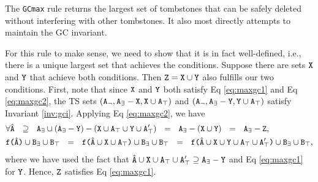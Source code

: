 \documentclass[10pt]{proc}
\numberwithin{equation}{section}
\renewcommand{\tt}[1]{\ifmmode\text{\texttt{#1}}\else\texttt{#1}\fi}
\begin{document}
The \tt{GCmax} rule returns the largest set of tombstones that can be safely deleted without interfering with other tombstones.
It also most directly attempts to maintain the GC invariant.

For this rule to make sense, we need to show that it is in fact well-defined, i.e., there is a unique largest set that achieves the conditions.
Suppose there are sets $\tt{X}$ and $\tt{Y}$ that achieve both conditions.
Then $\tt{Z} = \tt{X} \cup \tt{Y}$ also fulfills our two conditions.
First, note that since $\tt{X}$ and $\tt{Y}$ both satisfy Eq \eqref{eq:maxgc1} and Eq \eqref{eq:maxgc2}, the TS sets $(\tt{A}_\neg, \tt{A}_\exists - \tt{X}, \tt{X} \cup \tt{A}_\top)$ and $(\tt{A}_\neg, \tt{A}_\exists - \tt{Y}, \tt{Y} \cup \tt{A}_\top)$ satisfy Invariant \ref{inv:gci}.
Applying Eq \eqref{eq:maxgc2}, we have
\begin{align*}
&\forall\hat{\tt{A}}
  ~~\supseteq~~ \tt{A}_\exists \cup (\tt{A}_\exists - \tt{Y}) - (\tt{X} \cup \tt{A}_\top \cup \tt{Y} \cup \tt{A}_\top')
  ~~=~~ \tt{A}_\exists - (\tt{X} \cup \tt{Y})
  ~~=~~ \tt{A}_\exists - \tt{Z},\\
&\tt{f($\hat{\tt{A}}$)} \cup \tt{B}_\exists \cup \tt{B}_\top
  ~~=~~ \tt{f($\hat{\tt{A}} \cup \tt{X} \cup \tt{A}_\top$)} \cup \tt{B}_\exists \cup \tt{B}_\top
  ~~=~~ \tt{f($\hat{\tt{A}} \cup \tt{X} \cup \tt{Y} \cup \tt{A}_\top \cup \tt{A}_\top'$)} \cup \tt{B}_\exists \cup \tt{B}_\top,
\end{align*}
where we have used the fact that $\hat{\tt{A}} \cup \tt{X} \cup \tt{A}_\top \cup \tt{A}_\top' \supseteq \tt{A}_\exists - \tt{Y}$ and Eq \eqref{eq:maxgc1} for $\tt{Y}$.
Hence, $\tt{Z}$ satisfies Eq \eqref{eq:maxgc1}.
\end{document}
